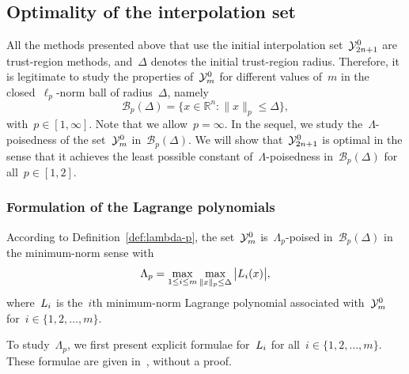 \documentclass{article}
\numberwithin{equation}{section}
\theoremstyle{definition}
\theoremstyle{plain}
\theoremstyle{remark}
\newcommand*{\abs}[2][]{#1\lvert#2#1\rvert}
\newcommand*{\lagp}[1][]{L\ifblank{#1}{}{_{#1}}}
\newcommand*{\norm}[2][]{#1\lVert#2#1\rVert}
\newcommand*{\R}{\mathbb{R}}
\newcommand*{\set}[2][]{#1\{#2#1\}}
\newcommand*{\xpt}[1][]{\mathcal{Y}\ifblank{#1}{}{^{#1}}}
\begin{document}
\subsection{Optimality of the interpolation set}

All the methods presented above that use the initial interpolation set~$\xpt[0]_{2n + 1}$ are trust-region methods, and~$\Delta$ denotes the initial trust-region radius.
Therefore, it is legitimate to study the properties of~$\xpt[0]_m$ for different values of~$m$ in the closed~$\ell_p$-norm ball of radius~$\Delta$, namely
\begin{equation*}
    \mathcal{B}_p(\Delta) = \set{x \in \R^n : \norm{x}_p \le \Delta},
\end{equation*}
with~$p \in [1, \infty]$.
Note that we allow~$p = \infty$.
In the sequel, we study the~$\Lambda$-poisedness of the set~$\xpt[0]_m$ in~$\mathcal{B}_p(\Delta)$.
We will show that~$\xpt[0]_{2n + 1}$ is optimal in the sense that it achieves the least possible constant of~$\Lambda$-poisedness in~$\mathcal{B}_p(\Delta)$ for all~$p \in [1, 2]$.

\subsubsection{Formulation of the Lagrange polynomials}

According to Definition~\ref{def:lambda-p}, the set~$\xpt[0]_m$ is~$\Lambda_p$-poised in~$\mathcal{B}_p(\Delta)$ in the minimum-norm sense with
\begin{equation*}
    \Lambda_p = \max_{1 \le i \le m} \max_{\norm{x}_p \le \Delta} \abs[\big]{\lagp[i](x)},
\end{equation*}
where~$\lagp[i]$ is the~$i$th minimum-norm Lagrange polynomial associated with~$\xpt[0]_m$ for~$i \in \set{1, 2, \dots, m}$.

To study~$\Lambda_p$, we first present explicit formulae for~$\lagp[i]$ for all~$i \in \set{1, 2, \dots, m}$.
These formulae are given in~\cite[\S~3]{Powell_2006}, without a proof.
\end{document}

